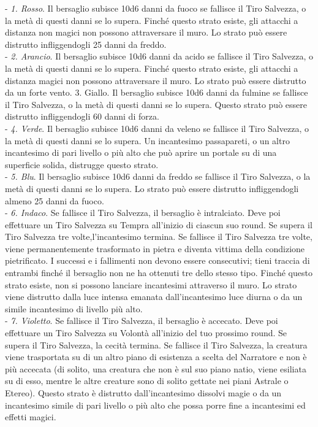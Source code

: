 \begin{multicols}{2}
- \textit{1. Rosso}. Il bersaglio subisce 10d6 danni da fuoco se fallisce il Tiro Salvezza, o la metà di questi danni se lo supera. Finché questo strato esiste, gli attacchi a distanza non magici non possono attraversare il muro. Lo strato può essere distrutto infliggendogli 25 danni da freddo.\\
- \textit{2. Arancio}. Il bersaglio subisce 10d6 danni da acido se fallisce il Tiro Salvezza, o la metà di questi danni se lo supera. Finché questo strato esiste, gli attacchi a distanza magici non possono attraversare il muro. Lo strato può essere distrutto da un forte vento. 3. Giallo. Il bersaglio subisce 10d6 danni da fulmine se fallisce il Tiro Salvezza, o la metà di questi danni se lo supera. Questo strato può essere distrutto infliggendogli 60 danni di forza.\\
- \textit{4. Verde}. Il bersaglio subisce 10d6 danni da veleno se fallisce il Tiro Salvezza, o la metà di questi danni se lo supera. Un incantesimo passapareti, o un altro incantesimo di pari livello o più alto che può aprire un portale su di una superficie solida, distrugge questo strato.\\
- \textit{5. Blu}. Il bersaglio subisce 10d6 danni da freddo se fallisce il Tiro Salvezza, o la metà di questi danni se lo supera. Lo strato può essere distrutto infliggendogli almeno 25 danni da fuoco.\\
- \textit{6. Indaco}. Se fallisce il Tiro Salvezza, il bersaglio è intralciato. Deve poi effettuare un Tiro Salvezza su Tempra all'inizio di ciascun suo round. Se supera il Tiro Salvezza tre volte,l'incantesimo termina. Se fallisce il Tiro Salvezza tre volte, viene permanentemente trasformato in pietra e diventa vittima della condizione pietrificato. I successi e i fallimenti non devono essere consecutivi; tieni traccia di entrambi finché il bersaglio non ne ha ottenuti tre dello stesso tipo. Finché questo strato esiste, non si possono lanciare incantesimi attraverso il muro. Lo strato viene distrutto dalla luce intensa emanata dall'incantesimo luce diurna o da un simile incantesimo di livello più alto.\\
- \textit{7. Violetto}. Se fallisce il Tiro Salvezza, il bersaglio è accecato. Deve poi effettuare un Tiro Salvezza su Volontà all'inizio del tuo prossimo round. Se supera il Tiro Salvezza, la cecità termina. Se fallisce il Tiro Salvezza, la creatura viene trasportata su di un altro piano di esistenza a scelta del Narratore e non è più accecata (di solito, una creatura che non è sul suo piano natio, viene esiliata su di esso, mentre le altre creature sono di solito gettate nei piani Astrale o Etereo). Questo strato è distrutto dall'incantesimo dissolvi magie o da un incantesimo simile di pari livello o più alto che possa porre fine a incantesimi ed effetti magici.


\end{multicols}
